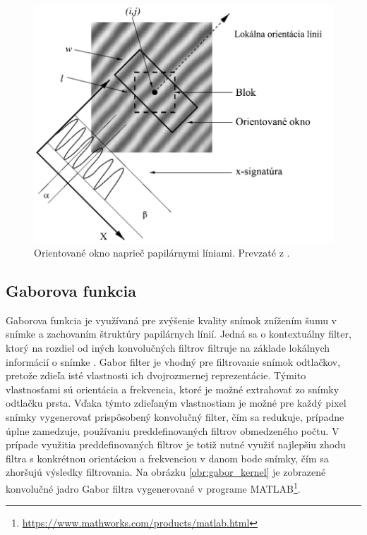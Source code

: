   \begin{figure}[h]
    \centering
    \includegraphics[width=0.8\linewidth]{obrazky-figures/frekvencia-Hong.png} %
    \caption{Orientované okno naprieč papilárnymi líniami. Prevzaté z \cite{Hong}.}
    \label{obr:frekvencia-Hong}
  \end{figure}

  \subsection{Gaborova funkcia}
  Gaborova funkcia je využívaná pre zvýšenie kvality snímok znížením šumu v snímke a zachovaním štruktúry papilárnych línií. Jedná sa o kontextuálny
  filter, ktorý na rozdiel od iných konvolučných filtrov filtruje na základe lokálnych informácií o snímke \cite{Handbook}. Gabor filter je vhodný
  pre filtrovanie snímok odtlačkov, pretože zdieľa isté vlastnosti ich dvojrozmernej reprezentácie. Týmito vlastnosťami sú orientácia a frekvencia,
  ktoré je možné extrahovať zo snímky odtlačku prsta. Vďaka týmto zdieľaným vlastnostiam je možné pre každý pixel snímky vygenerovať prispôsobený konvolučný
  filter, čím sa redukuje, prípadne úplne zamedzuje, používaniu preddefinovaných filtrov obmedzeného počtu. V prípade využitia preddefinovaných filtrov je totiž
  nutné využiť najlepšiu zhodu filtra s konkrétnou orientáciou a frekvenciou v danom bode snímky, čím sa zhoršujú výsledky filtrovania.
  Na obrázku \ref{obr:gabor_kernel} je zobrazené konvolučné jadro Gabor filtra vygenerované v programe
  MATLAB\footnote{\href{https://www.mathworks.com/products/matlab.html}{https://www.mathworks.com/products/matlab.html}}.
  
